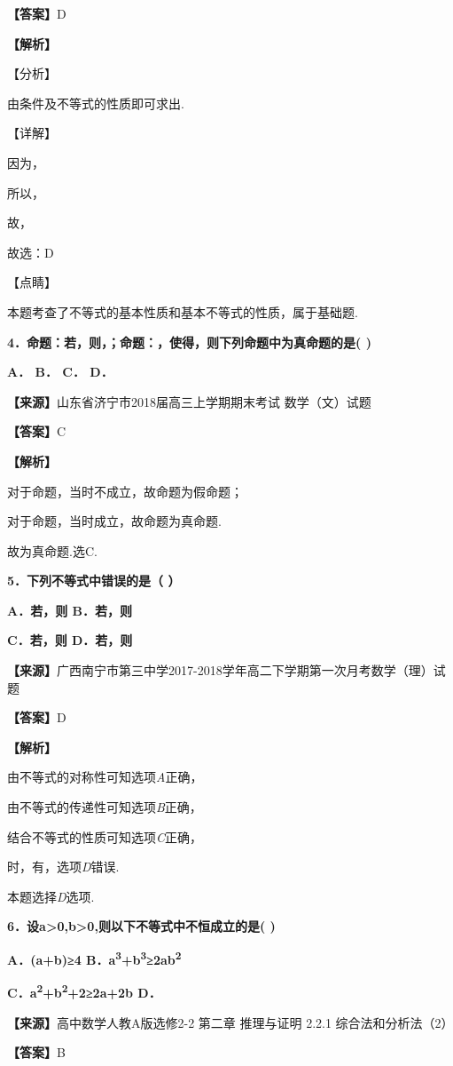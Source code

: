 \documentclass[
]{article}
\begin{document}
\textbf{【答案】}D

\textbf{【解析】}

【分析】

由条件及不等式的性质即可求出.

【详解】

因为，

所以，

故，

故选：D

【点睛】

本题考查了不等式的基本性质和基本不等式的性质，属于基础题.

\textbf{4．命题：若，则，；命题：，使得，则下列命题中为真命题的是( )}

\textbf{A． B． C． D．}

\textbf{【来源】}山东省济宁市2018届高三上学期期末考试 数学（文）试题

\textbf{【答案】}C

\textbf{【解析】}

对于命题，当时不成立，故命题为假命题；

对于命题，当时成立，故命题为真命题.

故为真命题.选C.

\textbf{5．下列不等式中错误的是（ ）}

\textbf{A．若，则 B．若，则}

\textbf{C．若，则 D．若，则}

\textbf{【来源】}广西南宁市第三中学2017-2018学年高二下学期第一次月考数学（理）试题

\textbf{【答案】}D

\textbf{【解析】}

由不等式的对称性可知选项\emph{A}正确，

由不等式的传递性可知选项\emph{B}正确，

结合不等式的性质可知选项\emph{C}正确，

时，有，选项\emph{D}错误.

本题选择\emph{D}选项.

\textbf{6．设a\textgreater0,b\textgreater0,则以下不等式中不恒成立的是(
)}

\textbf{A．(a+b)≥4
B．a\textsuperscript{3}+b\textsuperscript{3}≥2ab\textsuperscript{2}}

\textbf{C．a\textsuperscript{2}+b\textsuperscript{2}+2≥2a+2b D．}

\textbf{【来源】}高中数学人教A版选修2-2 第二章 推理与证明 2.2.1
综合法和分析法（2）

\textbf{【答案】}B
\end{document}
